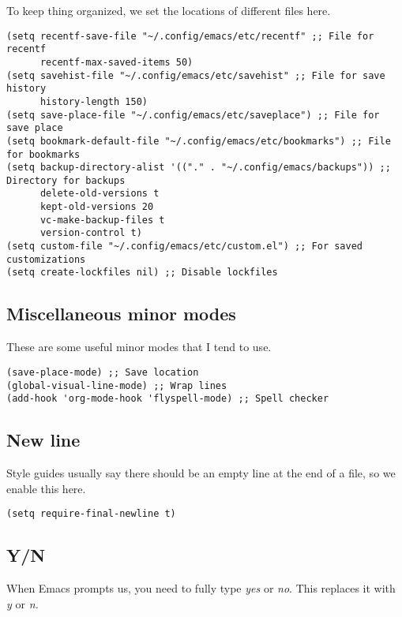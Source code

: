\documentclass[11pt]{article}
\begin{document}
To keep thing organized, we set the locations of different files here.

\begin{verbatim}
(setq recentf-save-file "~/.config/emacs/etc/recentf" ;; File for recentf
      recentf-max-saved-items 50)
(setq savehist-file "~/.config/emacs/etc/savehist" ;; File for save history
      history-length 150)
(setq save-place-file "~/.config/emacs/etc/saveplace") ;; File for save place
(setq bookmark-default-file "~/.config/emacs/etc/bookmarks") ;; File for bookmarks
(setq backup-directory-alist '(("." . "~/.config/emacs/backups")) ;; Directory for backups
      delete-old-versions t
      kept-old-versions 20
      vc-make-backup-files t
      version-control t)
(setq custom-file "~/.config/emacs/etc/custom.el") ;; For saved customizations
(setq create-lockfiles nil) ;; Disable lockfiles
\end{verbatim}

\subsection*{Miscellaneous minor modes}
\label{sec:orgf19a807}

These are some useful minor modes that I tend to use.

\begin{verbatim}
(save-place-mode) ;; Save location
(global-visual-line-mode) ;; Wrap lines
(add-hook 'org-mode-hook 'flyspell-mode) ;; Spell checker
\end{verbatim}

\subsection*{New line}
\label{sec:orga634346}

Style guides usually say there should be an empty line at the end of a file, so we enable this here.

\begin{verbatim}
(setq require-final-newline t)
\end{verbatim}

\subsection*{Y/N}
\label{sec:org6fcb166}

When Emacs prompts us, you need to fully type \emph{yes} or \emph{no}. This replaces it with \emph{y} or \emph{n.}
\end{document}
